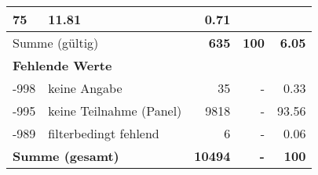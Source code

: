 \begin{longtable}{lXrrr}
       \num{75} &
       \num[round-mode=places,round-precision=2]{11.81} &
         \num[round-mode=places,round-precision=2]{0.71} \\
     \midrule
     \multicolumn{2}{l}{Summe (gültig)} &
       \textbf{\num{635}} &
     \textbf{\num{100}} &
       \textbf{\num[round-mode=places,round-precision=2]{6.05}} \\
     \multicolumn{5}{l}{\textbf{Fehlende Werte}}\\
       -998 &
       keine Angabe &
         \num{35} &
        - &
         \num[round-mode=places,round-precision=2]{0.33} \\
       -995 &
       keine Teilnahme (Panel) &
         \num{9818} &
        - &
         \num[round-mode=places,round-precision=2]{93.56} \\
       -989 &
       filterbedingt fehlend &
         \num{6} &
        - &
         \num[round-mode=places,round-precision=2]{0.06} \\
     \midrule
     \multicolumn{2}{l}{\textbf{Summe (gesamt)}} &
          \textbf{\num{10494}} &
        \textbf{-} &
        \textbf{\num{100}} \\
     \bottomrule
     \end{longtable}
     
